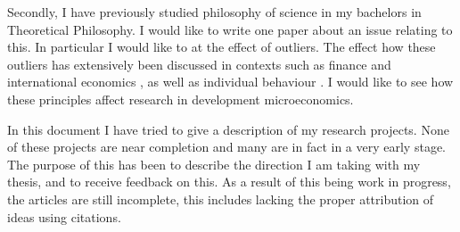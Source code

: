 \begin{refsection}
Secondly, I have previously studied philosophy of science in my bachelors in Theoretical Philosophy. I would like to write one paper about an issue relating to this. In particular I would like to at the effect of outliers. The effect how these outliers has extensively been discussed in contexts such as finance and international economics \parencite{taleb2010black,   sornette2009dragon},  as well as individual behaviour \parencite{kahneman2011thinking}. I would like to see how these principles affect research in development microeconomics.

In this document I have tried to give a description of my research projects. None of these projects are near completion and many are in fact in a very early stage. The purpose of this has been to describe the direction I am taking with my thesis, and to receive feedback on this. As a result of this being work in progress, the articles are still incomplete, this includes lacking the proper attribution of ideas using citations.

\printbibliography
\end{refsection}